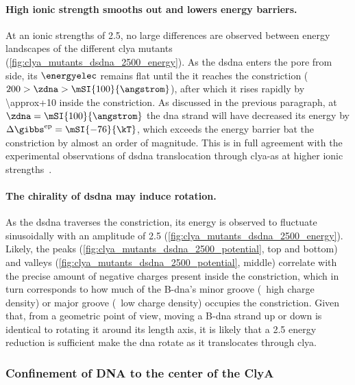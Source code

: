 \paragraph{High ionic strength smooths out and lowers energy barriers.} 
%
At an ionic strengths of \SI{2.5}{\Molar}, no large differences are observed between energy landscapes of the
different \gls{clya} mutants (\cref{fig:clya_mutants_dsdna_2500_energy}). As the \gls{dsdna} enters the pore
from \cisi{} side, its $\energyelec$ remains flat until the it reaches the constriction ($200 > \zdna >
\mSI{100}{\angstrom}$), after which it rises rapidly by \SI{\approx+10}{\kT} inside the constriction. As
discussed in the previous paragraph, at $\zdna = \mSI{100}{\angstrom}$ the \gls{dna} strand will have
decreased its energy by $\Delta \gibbs^{\textrm{ep}} = \mSI{-76}{\kT}$, which exceeds the energy barrier bat
the constriction by almost an order of magnitude. This is in full agreement with the experimental observations
of \gls{dsdna} translocation through \gls{clya-as} at higher ionic
strengths~\cite{Franceschini-2013,Franceschini-2016}.

\paragraph{The chirality of \gls{dsdna} may induce rotation.}
%
As the \gls{dsdna} traverses the constriction, its energy is observed to fluctuate sinusoidally with an
amplitude of \SI{2.5}{\kT} (\cref{fig:clya_mutants_dsdna_2500_energy}). Likely, the peaks
(\cref{fig:clya_mutants_dsdna_2500_potential}, top and bottom) and valleys
(\cref{fig:clya_mutants_dsdna_2500_potential}, middle) correlate with the precise amount of negative charges
present inside the constriction, which in turn corresponds to how much of the B-\gls{dna}'s minor groove
(\ie~high charge density) or major groove (\ie~low charge density) occupies the constriction. Given that, from
a geometric point of view, moving a B-\gls{dna} strand up or down is identical to rotating it around its
length axis, it is likely that a \SI{2.5}{\kT} energy reduction is sufficient make the \gls{dna} rotate as it
translocates through \gls{clya}.


\subsubsection{Confinement of DNA to the center of the ClyA}
%


